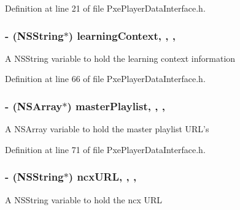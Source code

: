 Definition at line 21 of file Pxe\-Player\-Data\-Interface.\-h.

\hypertarget{interface_pxe_player_data_interface_a5d758a740c14531a20e76f60ad3d7893}{
\subsubsection[{learning\-Context}]{\setlength{\rightskip}{0pt plus 5cm}-\/ (N\-S\-String$\ast$) learning\-Context\hspace{0.3cm}{\ttfamily [read]}, {\ttfamily [write]}, {\ttfamily [nonatomic]}, {\ttfamily [strong]}}}\label{interface_pxe_player_data_interface_a5d758a740c14531a20e76f60ad3d7893}
A N\-S\-String variable to hold the learning context information 

Definition at line 66 of file Pxe\-Player\-Data\-Interface.\-h.

\hypertarget{interface_pxe_player_data_interface_a782e29876259f6a3f6571794356503e0}{
\subsubsection[{master\-Playlist}]{\setlength{\rightskip}{0pt plus 5cm}-\/ (N\-S\-Array$\ast$) master\-Playlist\hspace{0.3cm}{\ttfamily [read]}, {\ttfamily [write]}, {\ttfamily [nonatomic]}, {\ttfamily [strong]}}}\label{interface_pxe_player_data_interface_a782e29876259f6a3f6571794356503e0}
A N\-S\-Array variable to hold the master playlist U\-R\-L's 

Definition at line 71 of file Pxe\-Player\-Data\-Interface.\-h.

\hypertarget{interface_pxe_player_data_interface_ade76fc35011aade53e15ffa5414fc153}{
\subsubsection[{ncx\-U\-R\-L}]{\setlength{\rightskip}{0pt plus 5cm}-\/ (N\-S\-String$\ast$) ncx\-U\-R\-L\hspace{0.3cm}{\ttfamily [read]}, {\ttfamily [write]}, {\ttfamily [nonatomic]}, {\ttfamily [strong]}}}\label{interface_pxe_player_data_interface_ade76fc35011aade53e15ffa5414fc153}
A N\-S\-String variable to hold the ncx U\-R\-L 

